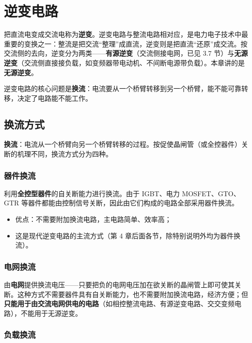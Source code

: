 \chapter{逆变电路}

把直流电变成交流电称为\textbf{逆变}。逆变电路与整流电路相对应，是电力电子技术中最重要的变换之一：整流是把交流“整理”成直流，逆变则是把直流“还原”成交流。按交流侧的去向，逆变分为两类——\textbf{有源逆变}（交流侧接电网，已见 3.7 节）与\textbf{无源逆变}（交流侧直接接负载，如变频器带电动机、不间断电源带负载）。本章讲的是\textbf{无源逆变}。

逆变电路的核心问题是\textbf{换流}：电流要从一个桥臂转移到另一个桥臂，能不能可靠转移，决定了电路能不能工作。

\section{换流方式}

\textbf{换流}：电流从一个桥臂向另一个桥臂转移的过程。按促使晶闸管（或全控器件）关断的机理不同，换流方式分为四种。

\subsection{器件换流}

利用\textbf{全控型器件}的自关断能力进行换流。由于 IGBT、电力 MOSFET、GTO、GTR 等器件都能由控制信号关断，因此由它们构成的电路全部采用器件换流。

\begin{itemize}
  \item 优点：不需要附加换流电路，主电路简单、效率高；
  \item 这是现代逆变电路的主流方式（第 4 章后面各节，除特别说明外均为器件换流）。
\end{itemize}

\subsection{电网换流}

由\textbf{电网}提供换流电压——只要把负的电网电压加在欲关断的晶闸管上即可使其关断。这种方式不需要器件具有自关断能力，也不需要附加换流电路，经济方便；但\textbf{只能用于由交流电网供电的电路}（如相控整流电路、有源逆变电路、交交变频电路），不能用于无源逆变。

\subsection{负载换流}

